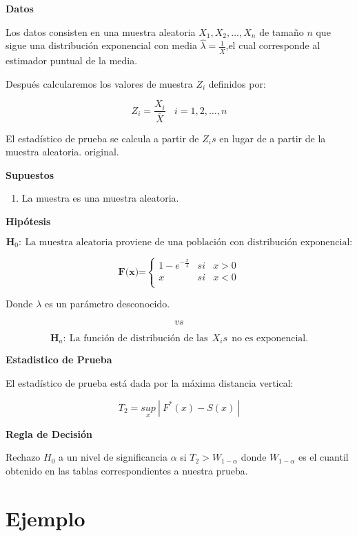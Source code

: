 \documentclass[
  a4paper,
  oneside,
  openany]{book}
\providecommand{\tightlist}{%
  \setlength{\itemsep}{0pt}\setlength{\parskip}{0pt}}
\begin{document}
\textbf{Datos}

Los datos consisten en una muestra aleatoria \(X_{1},X_{2},\ldots,X_{n}\) de tamaño \(n\) que sigue una distribución exponencial con media \(\hat{\lambda} = \frac{1}{\overline{X}}\),el cual corresponde al estimador puntual de la media.

Después calcularemos los valores de muestra \(Z_{i}\) definidos por:

\[Z_{i}=\frac{X_{i}}{\overline{X}} \ \ \ \ i=1,2,\ldots,n\]

El estadístico de prueba se calcula a partir de \(Z_{i}s\) en lugar de a partir de la muestra aleatoria. original.

\textbf{Supuestos}

\begin{enumerate}
\def\labelenumi{\arabic{enumi})}
\tightlist
\item
  La muestra es una muestra aleatoria.
\end{enumerate}

\textbf{Hipótesis}

\[\textbf{H}_0: \ \mbox{La muestra aleatoria proviene de una población con distribución exponencial:}\]

\[
\textbf{F(x)=} \left\{
\begin{array}{lcc}
1-e^{-\frac{x}{\lambda}} & si & x > 0 \\
x & si &  x < 0 \\
\end{array}
\right.
\]

Donde \(\lambda\) es un parámetro desconocido.

\[vs\]

\[\textbf{H}_a: \ \mbox{La función de distribución de las} \ \  X_{i}s \ \  \mbox{no es exponencial.}\]

\textbf{Estadistico de Prueba}

El estadístico de prueba está dada por la máxima distancia vertical:

\[T_{2}=\underset{x}{sup} \ | \ F^*(x)-S(x) \ |\]

\textbf{Regla de Decisión}

Rechazo \(H_0\) a un nivel de significancia \(\alpha\) si \(T_{2}> W_{1-\alpha}\) donde \(W_{1-\alpha}\) es el cuantil obtenido en las tablas correspondientes a nuestra prueba.

\hypertarget{ejemplo-14}{%
\section{Ejemplo}\label{ejemplo-14}}
\end{document}
